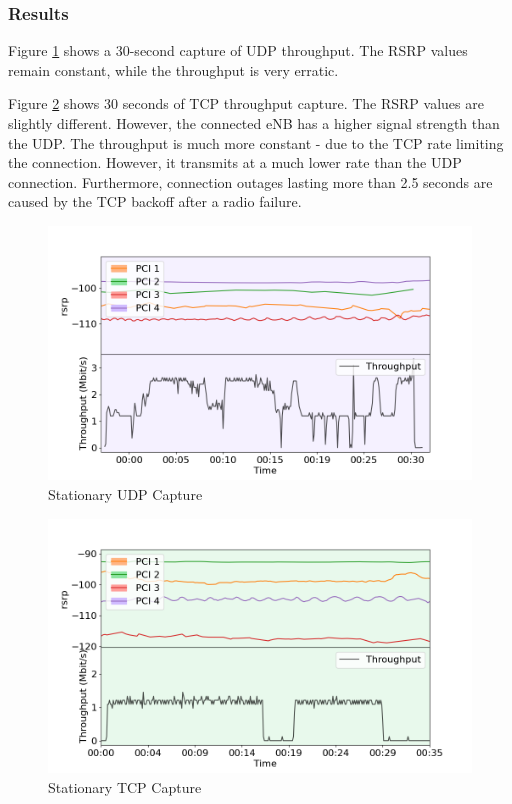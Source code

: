 \subsubsection{Results}
Figure \ref{fig:4udp} shows a 30-second capture of UDP throughput. The RSRP values remain constant, while the throughput is very erratic. 

Figure \ref{fig:4tcp} shows 30 seconds of TCP throughput capture. The RSRP values are slightly different. However, the connected eNB has a higher signal strength than the UDP. The throughput is much more constant - due to the TCP rate limiting the connection. However, it transmits at a much lower rate than the UDP connection. Furthermore, connection outages lasting more than 2.5 seconds are caused by the TCP backoff after a radio failure.

\begin{figure}
    \centering
    \includegraphics[width=0.75\linewidth]{src//img/4stationary_udp.png}
    \caption{Stationary UDP Capture}
    \label{fig:4udp}
\end{figure}
\begin{figure}
    \centering
    \includegraphics[width=0.75\linewidth]{src//img/4stationary_tcp.png}
    \caption{Stationary TCP Capture}
    \label{fig:4tcp}
\end{figure}

